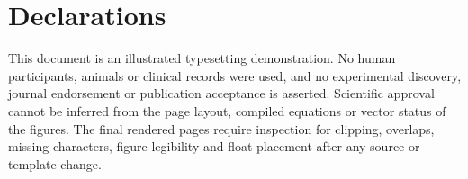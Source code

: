 \section*{Declarations}
This document is an illustrated typesetting demonstration. No human participants, animals or clinical records were used, and no experimental discovery, journal endorsement or publication acceptance is asserted. Scientific approval cannot be inferred from the page layout, compiled equations or vector status of the figures. The final rendered pages require inspection for clipping, overlaps, missing characters, figure legibility and float placement after any source or template change.
